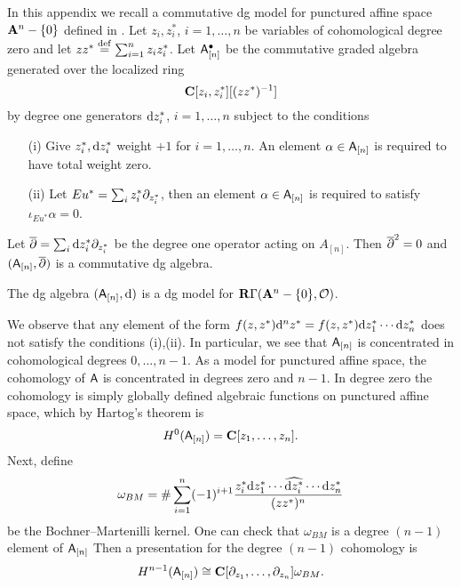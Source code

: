 \documentclass[11pt]{amsart}
\begin{document}
In this appendix we recall a commutative dg model for punctured affine space ${\mathbf{A}}^n - \{0\}$ defined in \cite{FHK}.
Let $z_i,z_i^*$, $i=1,\ldots,n$ be variables of cohomological degree zero and let $z z^* \overset{\rm def}{=} \sum_{i=1}^n z_i z_i^*$.
Let $\mathsf A_{[n]}^\bullet$ be the commutative graded algebra generated over the localized ring
\begin{equation}
\mathbf{C}[z_i,z_i^*] [(z z^*)^{-1}]
\end{equation}
by degree one generators ${\rm d} z_i^*$, $i=1,\ldots,n$ subject to the conditions
\begin{itemize}
\item[(i)] Give $z^*_i, {\rm d} z^*_i$ weight $+1$ for $i=1,\ldots,n$.
An element $\alpha \in \mathsf A_{[n]}$ is required to have total weight zero.
\item[(ii)] Let $Eu^* = \sum_i z_i^* \partial_{z_i^*}$, then an element $\alpha \in \mathsf A_{[n]}$ is required to satisfy $\iota_{Eu^*} \alpha = 0$.
\end{itemize}

Let $\overline{\partial} = \sum_i {\rm d} z_i^* \partial_{z_i^*}$ be the degree one operator acting on $A_{[n]}$.
Then $\overline{\partial}^2 = 0$ and $(\mathsf A_{[n]},\overline{\partial})$ is a commutative dg algebra.

\begin{thm}
The dg algebra $(\mathsf A_{[n]},{\rm d})$ is a dg model for $\mathbf{R} \Gamma({\mathbf{A}}^n - \{0\}, \mathcal O)$.
\end{thm}

We observe that any element of the form $f(z,z^*) {\rm d}^n z^* = f(z,z^*) {\rm d} z_1^* \cdots {\rm d} z_n^*$ does not satisfy the conditions (i),(ii).
In particular, we see that $\mathsf A_{[n]}$ is concentrated in cohomological degrees $0,\ldots,n-1$.
As a model for punctured affine space, the cohomology of $\mathsf A$ is concentrated in degrees zero and $n-1$.
In degree zero the cohomology is simply globally defined algebraic functions on punctured affine space, which by Hartog's theorem is
\begin{equation}
H^0(\mathsf A_{[n]}) = \mathbf{C}[z_1,\ldots,z_n] .
\end{equation}
Next, define
\begin{equation}
\omega_{BM} = \# \sum_{i=1}^n (-1)^{i+1} \frac{z_i^* {\rm d} z_1^* \cdots \widehat{{\rm d} z_i^*} \cdots {\rm d} z_n^* }{(z z^*)^n}
\end{equation}
be the Bochner--Martenilli kernel.
One can check that $\omega_{BM}$ is a degree $(n-1)$ element of $\mathsf A_{[n]}$
Then a presentation for the degree $(n-1)$ cohomology is 
\begin{equation}
H^{n-1}(\mathsf A_{[n]}) \cong \mathbf{C}[\partial_{z_1},\ldots,\partial_{z_n}] \omega_{BM} .
\end{equation}
\end{document}
